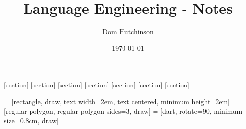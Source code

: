 \documentclass[11pt,a4paper]{article}
\begin{document}
\pagestyle{fancy}
\setlength\parindent{0pt}
\allowdisplaybreaks

[section]
[section]
[section]
[section]
[section]
[section]
[section]

\newcommand{\dotprod}{\boldsymbol{\cdot}}
\newcommand{\nats}{\mathbb{N}}
\newcommand{\real}{\mathbb{R}}
\newcommand{\ints}{\mathbb{Z}}
\newcommand{\nb}{\textit{N.B.} }


\newcommand{\definition}[1]{\stepcounter{definition} \textbf{Definition \arabic{section}.\arabic{definition}\ - }\textit{#1}\\}
\newcommand{\example}[1]{\stepcounter{example} \textbf{Example \arabic{section}.\arabic{example}\ - }\textit{#1}\\}
\newcommand{\notation}[1]{\stepcounter{notation} \textbf{Notation \arabic{section}.\arabic{notation}\ - }\textit{#1}\\}
\newcommand{\proposition}[1]{\stepcounter{proposition} \textbf{Proposition \arabic{section}.\arabic{proposition}\ - }\textit{#1}\\}
\newcommand{\proof}[1]{\stepcounter{proof} \textbf{Proof \arabic{section}.\arabic{proof}\ - }\textit{#1}\\}
\newcommand{\remark}[1]{\stepcounter{remark} \textbf{Remark \arabic{section}.\arabic{remark}\ - }\textit{#1}\\}
\newcommand{\theorem}[1]{\stepcounter{theorem} \textbf{Theorem \arabic{section}.\arabic{theorem}\ - }\textit{#1}\\}

  {\lstset{mathescape=true,xleftmargin=.1\textwidth}}
  {}

 = [rectangle, draw, text width=2em, text centered, minimum height=2em]
 = [regular polygon, regular polygon sides=3, draw]
 = [dart, rotate=90, minimum size=0.8cm, draw]

\renewcommand{\headrulewidth}{0pt}

\title{Language Engineering - Notes}
\author{Dom Hutchinson}
\date{\today}
\maketitle
\end{document}
